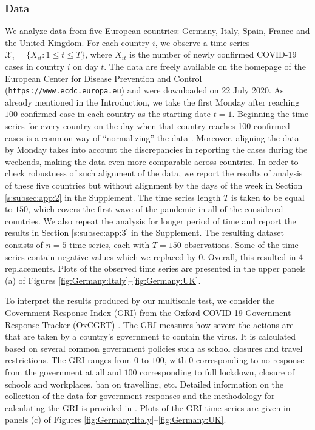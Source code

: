 \documentclass[a4paper,12pt]{article}
\numberwithin{equation}{section}
\begin{document}
\subsubsection{Data}

We analyze data from five European countries: Germany, Italy, Spain, France and the United Kingdom. For each country $i$, we observe a time series $\mathcal{X}_i = \{ X_{it}: 1 \le t \le T \}$, where $X_{it}$ is the number of newly confirmed COVID-19 cases in country $i$ on day $t$. The data are freely available on the homepage of the European Center for Disease Prevention and Control (\texttt{https://www.ecdc.europa.eu}) and were downloaded on 22 July 2020. {\color{red} As already mentioned in the Introduction, we take the first Monday after reaching $100$ confirmed case in each country as the starting date $t=1$. Beginning the time series for every country on the day when that country reaches 100 confirmed cases is a common way of ``normalizing'' the data \citep[e.g.][]{Cohen2020}. Moreover, aligning the data by Monday takes into account the discrepancies in reporting the cases during the weekends, making the data even more comparable across countries. In order to check robustness of such alignment of the data, we report the results of analysis of these five countries but without alignment by the days of the week in Section \ref{s:subsec:app:2} in the Supplement. The time series length $T$ is taken to be equal to $150$, which covers the first wave of the pandemic in all of the considered countries. We also repeat the analysis for longer period of time and report the results in Section \ref{s:subsec:app:3} in the Supplement. The resulting dataset consists of $n = 5$ time series, each with $T = 150$ observations.} Some of the time series contain negative values which we replaced by $0$. Overall, this resulted in {\color{red}$4$} replacements. Plots of the observed time series are presented in the upper panels (a) of Figures \ref{fig:Germany:Italy}--\ref{fig:Germany:UK}.


To interpret the results produced by our multiscale test, we consider the Government Response Index (GRI) from the Oxford COVID-19 Government Response Tracker (OxCGRT) \citep{Hale2020}. The GRI measures how severe the actions are that are taken by a country's government to contain the virus. It is calculated based on several common government policies such as school closures and travel restrictions. The GRI ranges from $0$ to $100$, with $0$ corresponding to no response from the government at all and $100$ corresponding to full lockdown, closure of schools and workplaces, ban on travelling, etc. Detailed information on the collection of the data for government responses and the methodology for calculating the GRI is provided in \cite{Hale2020paper}. Plots of the GRI time series are given in panels (c) of Figures \ref{fig:Germany:Italy}--\ref{fig:Germany:UK}.
\end{document}

